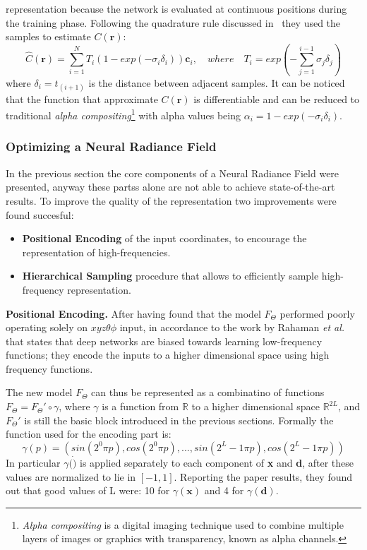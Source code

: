 representation because the network is evaluated at continuous positions during the training phase.
Following the quadrature rule discussed in~\cite{nerf26} they used the samples to estimate $C(\textbf{r})$:
\begin{equation}\label{eq:neural_C}
    \widehat{C}(\textbf{r}) = \sum_{i=1}^N T_i (1-exp(-\sigma_i \delta_i))\textbf{c}_i, \quad where \quad T_i = exp(-\sum_{j=1}^{i-1}\sigma_j\delta_j)
\end{equation}
where $\delta_i =t_(i+1)$ is the distance between adjacent samples. It can be noticed that the function that approximate $C(\textbf{r})$ is differentiable and can be 
reduced to traditional \textit{alpha compositing}\footnote{\textit{Alpha compositing} is a digital imaging technique used to combine multiple layers of images or graphics with transparency, known as alpha channels.}
with alpha values being $\alpha_i = 1-exp(-\sigma_i \delta_i)$.

\subsubsection{Optimizing a Neural Radiance Field}
In the previous section the core components of a Neural Radiance Field were presented, anyway these partss alone are not able to 
achieve state-of-the-art results. To improve the quality of the representation two improvements were found succesful:
\begin{itemize}
    \item \textbf{Positional Encoding} of the input coordinates, to encourage the representation of high-frequencies.
    \item \textbf{Hierarchical Sampling} procedure that allows to efficiently sample high-frequency representation.
\end{itemize} 

\textbf{Positional Encoding.} After having found that the model $F_\Theta$ performed poorly operating solely on $xyz\theta\phi$ input, in accordance
to the work by Rahaman \textit{et al.}~\cite{nerf35} that states that deep networks are biased towards
learning low-frequency functions; they encode the inputs to a higher dimensional space using high frequency functions. 

The new model $F_\Theta$ can thus be represented as a combinatino of functions $F_\Theta = F_\Theta'\circ \gamma$, where $\gamma$ is a function from $\mathbb{R}$ 
to a higher dimensional space $\mathbb{R}^{2L}$, and  $F_\Theta'$ is still the basic block introduced in the previous sections.
Formally the function used for the encoding part is:
\begin{equation}
    \gamma(p) = (sin(2^0 \pi p), cos(2^0 \pi p), ...,sin(2^L-1 \pi p), cos(2^L-1 \pi p))
\end{equation}
In particular $\gamma(\dot)$ is applied  separately to each component of \textbf{x} and \textbf{d}, after these values are normalized to lie in $[-1,1]$.
Reporting the paper results, they found out that good values of L were: 10 for $\gamma(\textbf{x})$ and 4 for $\gamma(\textbf{d})$.

